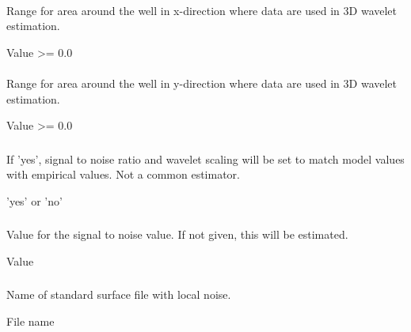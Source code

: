 \paragraph{}
 \slist
   \item \Description Range for area around the well in x-direction where data are used in 3D wavelet estimation.
   \item \Argument Value >= 0.0
   \item {}
\elist

\paragraph{}
 \slist
   \item \Description Range for area around the well in y-direction where data are used in 3D wavelet estimation.
   \item \Argument Value >= 0.0
   \item {}
\elist

\subsubsection{}
 \slist
   \item \Description If 'yes', signal to noise ratio and wavelet scaling will be set to match model values with empirical values. Not a common estimator.
   \item \Argument 'yes' or 'no'
   \item \Default
 \elist

\subsubsection{}
 \slist
   \item \Description Value for the signal to noise value. If not given, this will be estimated.
   \item \Argument Value
   \item \Default
 \elist

\subsubsection{}
 \slist
   \item \Description Name of standard surface file with local noise.
   \item \Argument File name
   \item \Default
 \elist

